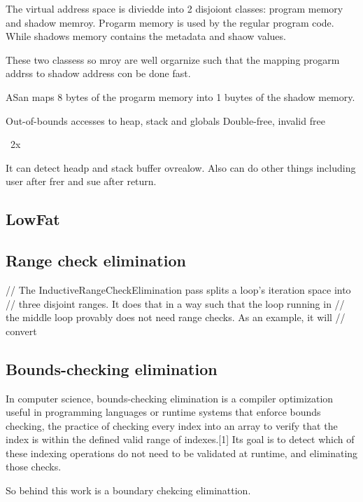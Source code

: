 The virtual address space is diviedde into 2 disjoiont classes:
program memory and shadow memroy.
Progarm memory is used by the regular program code.
While shadows memory contains the metadata and shaow values.

These two classess so mroy are well orgarnize such that the mapping progarm addrss
to shadow address con be done fast.

ASan maps 8 bytes of the progarm memory into 1 buytes of the shadow memory.

Out-of-bounds accesses to heap, stack and globals
Double-free, invalid free


~2x

It can detect headp and stack buffer ovrealow.
Also can do other things including user after frer and sue after return.



\subsection{LowFat}


\subsection{   Range check elimination}
// The InductiveRangeCheckElimination pass splits a loop's iteration space into
// three disjoint ranges.  It does that in a way such that the loop running in
// the middle loop provably does not need range checks. As an example, it will
// convert


\subsection{Bounds-checking elimination}
In computer science, bounds-checking elimination is a compiler optimization useful in programming languages or runtime systems that enforce bounds checking, the practice of checking every index into an array to verify that the index is within the defined valid range of indexes.[1] Its goal is to detect which of these indexing operations do not need to be validated at runtime, and eliminating those checks.

So behind this work is a boundary chekcing eliminattion.



